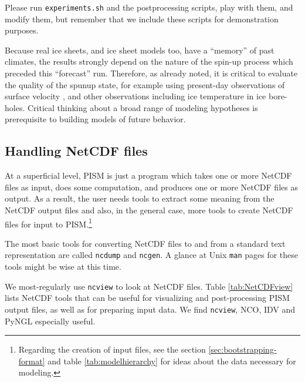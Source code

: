 Please run \verb|experiments.sh| and the postprocessing scripts, play with them, and modify them, but remember that we include these scripts for demonstration purposes.

Because real ice sheets, and ice sheet models too, have a ``memory'' of past climates, the results strongly depend on the nature of the spin-up process which preceded this ``forecast'' run.  Therefore, as already noted, it is critical to evaluate the quality of the spunup state, for example using present-day observations of surface velocity \cite{AschwandenAdalgeirsdottirKhroulev}, and other observations including ice temperature in ice bore-holes.  Critical thinking about a broad range of modeling hypotheses is prerequisite to building models of future behavior.


\subsection{Handling NetCDF files}\label{subsect:nctoolsintro}  At a superficial level, PISM is just a program which takes one or more NetCDF files as input, does some computation, and produces one or more NetCDF files as output.  As a result, the user needs tools to extract some meaning from the NetCDF output files and also, in the general case, more tools to create NetCDF files for input to PISM.\footnote{Regarding the creation of input files, see the section \ref{sec:bootstrapping-format} and table \ref{tab:modelhierarchy} for ideas about the data necessary for modeling.}

The most basic tools for converting NetCDF files to and from a standard text representation are called \texttt{ncdump} and \texttt{ncgen}.  A glance at Unix \texttt{man} pages for these tools might be wise at this time.

We most-regularly use \texttt{ncview} to look at NetCDF files.  Table \ref{tab:NetCDFview} lists NetCDF tools that can be useful for visualizing and post-processing PISM output files, as well as for preparing input data.  We find \texttt{ncview}, NCO, IDV and PyNGL especially useful.

